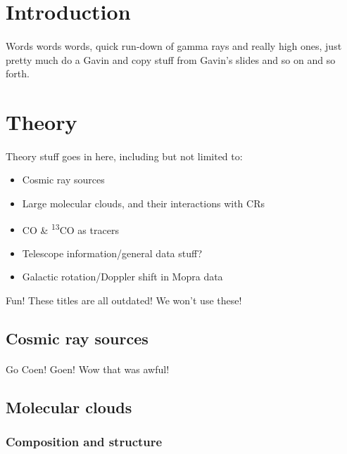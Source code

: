 \documentclass[a4paper, titlepage, oneside]{article}
\newcommand{\elem}[2]{\textsuperscript{#1}{#2}}
\begin{document}
\begin{multicols}{2}
\section{Introduction}
\paragraph{}
Words words words, quick run-down of gamma rays and really high ones, just pretty much do a Gavin and copy stuff from Gavin's slides and so on and so forth.

\section{Theory}
\paragraph{}
Theory stuff goes in here, including but not limited to:
\begin{itemize}
  \item Cosmic ray sources
  \item Large molecular clouds, and their interactions with CRs
  \item CO \& \elem{13}{CO} as tracers
  \item Telescope information/general data stuff?
  \item Galactic rotation/Doppler shift in Mopra data
\end{itemize}
Fun! These titles are all outdated! We won't use these!

\subsection{Cosmic ray sources}
\paragraph{}
Go Coen! Goen! Wow that was awful!

\subsection{Molecular clouds}
\subsubsection{Composition and structure}

\end{multicols}
\end{document}
